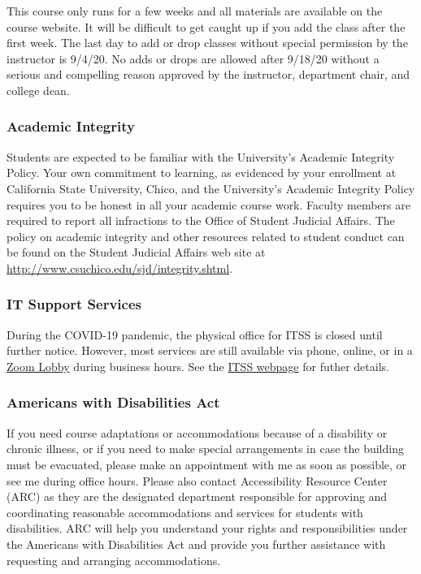 \documentclass[
  11pt,
]{article}
\begin{document}
This course only runs for a few weeks and all materials are available on
the course website. It will be difficult to get caught up if you add the
class after the first week. The last day to add or drop classes without
special permission by the instructor is 9/4/20. No adds or drops are
allowed after 9/18/20 without a serious and compelling reason approved
by the instructor, department chair, and college dean.

\hypertarget{academic-integrity}{%
\subsubsection{Academic Integrity}\label{academic-integrity}}

Students are expected to be familiar with the University's Academic
Integrity Policy. Your own commitment to learning, as evidenced by your
enrollment at California State University, Chico, and the University's
Academic Integrity Policy requires you to be honest in all your academic
course work. Faculty members are required to report all infractions to
the Office of Student Judicial Affairs. The policy on academic integrity
and other resources related to student conduct can be found on the
Student Judicial Affairs web site at
\url{http://www.csuchico.edu/sjd/integrity.shtml}.

\hypertarget{it-support-services}{%
\subsubsection{IT Support Services}\label{it-support-services}}

During the COVID-19 pandemic, the physical office for ITSS is closed
until further notice. However, most services are still available via
phone, online, or in a
\href{https://csuchico.zoom.us/j/5308984357?pwd=WUwwaXJQUTNPSnJqc1hTemxPY0ZiQT09}{Zoom
Lobby} during business hours. See the
\href{https://www.csuchico.edu/itss/}{ITSS webpage} for futher details.

\hypertarget{americans-with-disabilities-act}{%
\subsubsection{Americans with Disabilities
Act}\label{americans-with-disabilities-act}}

If you need course adaptations or accommodations because of a disability
or chronic illness, or if you need to make special arrangements in case
the building must be evacuated, please make an appointment with me as
soon as possible, or see me during office hours. Please also contact
Accessibility Resource Center (ARC) as they are the designated
department responsible for approving and coordinating reasonable
accommodations and services for students with disabilities. ARC will
help you understand your rights and responsibilities under the Americans
with Disabilities Act and provide you further assistance with requesting
and arranging accommodations.
\end{document}

